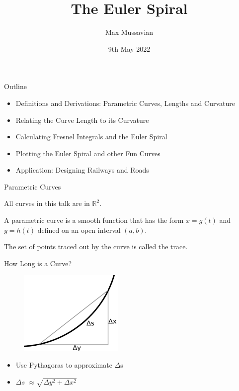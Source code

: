 \documentclass{beamer}
\title{The Euler Spiral}
\author{Max Mussavian}
\date[2022]{9th May 2022}
\begin{document}
\begin{frame}[plain]
    \maketitle
\end{frame}
\begin{frame}{Outline}
	\begin{itemize}
		\item Definitions and Derivations: Parametric Curves, Lengths and Curvature
		\item Relating the Curve Length to its Curvature
		\item Calculating Fresnel Integrals and the Euler Spiral
		\item Plotting the Euler Spiral and other Fun Curves
		\item Application: Designing Railways and Roads
	\end{itemize}
\end{frame}


\begin{frame}{Parametric Curves}
	
		All curves in this talk are in $\mathbb{R}^2$.
		\begin{definition}
			A parametric curve is a \alert{{smooth}} function that has the form
			$x = g(t)$ and $y=h(t)$ defined on an open interval $(a, b)$.
		
			The set of points traced out by the curve is called the trace.
		\end{definition}
	
\end{frame}

	\begin{frame}{How Long is a Curve?}
		\begin{figure}
		\centering
		\includegraphics[width=50mm, scale=0.4]{arc_length_integral.png}
		\end{figure}
		\begin{itemize}
		\item Use Pythagoras to approximate $\Delta$s
		\item $\Delta s $ 
		$ \approx	\sqrt{\Delta y^2 + \Delta x^2} $
		\end{itemize}
	\end{frame}
\end{document}
